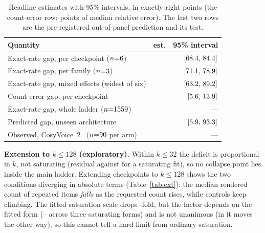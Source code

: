 \documentclass{article}
\newcommand{\tabsize}{\small}
\begin{document}
\begin{table}[t]
\centering
\caption{Headline estimates with 95\% intervals, in exactly-right points
(the count-error row: points of median relative error). The last two rows
are the pre-registered out-of-panel prediction and its test.}
\label{tab:ci}
{\tabsize\setlength{\tabcolsep}{3.5pt}
\begin{tabular}{lrr}
\toprule
Quantity & est. & 95\% interval \\
\midrule
Exact-rate gap, per checkpoint ($n{=}6{}$) & \CkExact{} & $[68.4{},\,84.4{}]$ \\
Exact-rate gap, per family ($n{=}3{}$)    & \FamExact{} & $[71.1{},\,78.9{}]$ \\
Exact-rate gap, mixed effects (widest of six)      & \MixArm{}  & $[63.2{},\,89.2{}]$ \\
Count-error gap, per checkpoint                    & \CkErr{}   & $[5.6{},\,13.9{}]$ \\
Exact-rate gap, whole ladder ($n{=}1559{}$) & \FullLadderGap{} & --- \\
\midrule
Predicted gap, unseen architecture                 & \BayesNewFam{} & $[5.9{},\,93.3{}]$ \\
Observed, CosyVoice~2~\cite{du2024cosyvoice2} ($n{=}90{}$ per arm) & \CosyGap{} & --- \\
\bottomrule
\end{tabular}}
\end{table}

\begin{table}[t]
\centering
\caption{Every system tested, $k\ge6$, CTC judge: median $(\hat c-k)/k$
and exactly-right rate, repeated (rep.) against control (ctl.). Systems in
the lower block are outside the panel; their count errors are in the
supplementary material.}
\label{tab:models}
{\tabsize\setlength{\tabcolsep}{2.5pt}}
\end{table}

\textbf{Extension to $k\le128$ (exploratory).}
Within $k\le32$ the deficit is proportional in $k$, not saturating
(residual \ShapePropSSE{} against \ShapeSatSSE{} for a saturating fit), so
no collapse point lies inside the main ladder. Extending \HzNModels{}
checkpoints to $k\le128$ shows the two conditions diverging in absolute terms
(Table~\ref{tab:ext}): the median rendered count of repeated items
\emph{falls} as the requested count rises, while controls keep climbing.
The fitted saturation scale drops \HzRatio{}-fold, but the factor
depends on the fitted form (\HzFormLo{}--\HzFormHi{} across three
saturating forms) and is not unanimous (in \HzRevNames{} it moves the
other way), so this cannot tell a hard limit from ordinary saturation.
\end{document}
